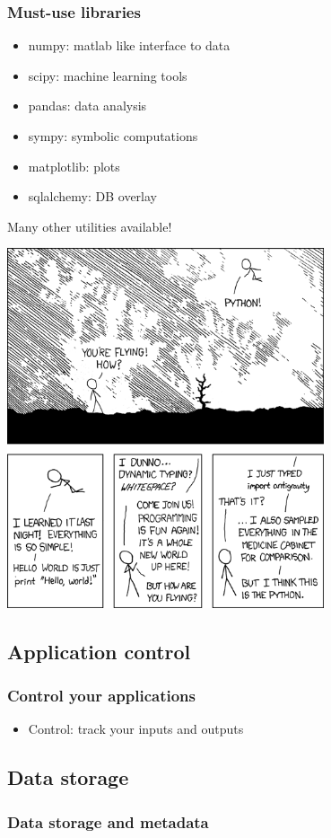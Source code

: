 \documentclass[14pt]{beamer}
\begin{document}
\begin{frame}
\frametitle{Must-use libraries}
\begin{itemize}
\item numpy: matlab like interface to data
\item scipy: machine learning tools
\item pandas: data analysis
\item sympy: symbolic computations
\item matplotlib: plots
\item sqlalchemy: DB overlay
\end{itemize}
Many other utilities available!
\end{frame}

\begin{frame}
\centering
\includegraphics[width=0.7\textwidth]{python}

\end{frame}

\subsection{Application control}
\begin{frame}
\frametitle{Control your applications}
\begin{itemize}
\item Control: track your inputs and outputs
\end{itemize}
\end{frame}

\subsection{Data storage}
\begin{frame}
\frametitle{Data storage and metadata}
\end{frame}
\end{document}
